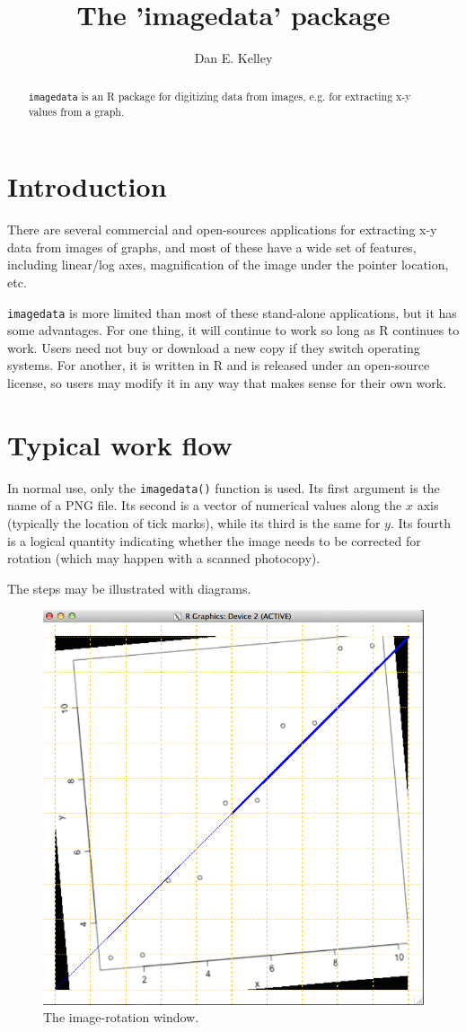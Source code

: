 \documentclass{article}
\newcommand{\function}[1]{\texttt{#1()}\xspace}
\newcommand{\package}{\texttt{imagedata}\xspace}
\begin{document}
\title{The 'imagedata' package}
\author{Dan E. Kelley}
\maketitle


\begin{abstract} \package is an R package for digitizing data from images, e.g.
    for extracting x-y values from a graph.  \end{abstract}

\section{Introduction}

There are several commercial and open-sources applications for extracting x-y
data from images of graphs, and most of these have a wide set of features,
including linear/log axes, magnification of the image under the pointer
location, etc.

\package is more limited than most of these stand-alone applications, but it has
some advantages.  For one thing, it will continue to work so long as R continues
to work.  Users need not buy or download a new copy if they switch operating
systems.  For another, it is written in R and is released under an open-source
license, so users may modify it in any way that makes sense for their own work.

\section{Typical work flow}

In normal use, only the \function{imagedata} function is used.  Its first argument
is the name of a PNG file.  Its second is a vector of numerical values along the
$x$ axis (typically the location of tick marks), while its third is the same for
$y$.  Its fourth is a logical quantity indicating whether the image needs to be
corrected for rotation (which may happen with a scanned photocopy).

The steps may be illustrated with diagrams.

\begin{figure}[ht]
    \begin{center}\includegraphics[width=0.5\hsize]{1.png}\end{center}
    \caption{\label{f:rotation}The image-rotation window.}
\end{figure}
\end{document}
